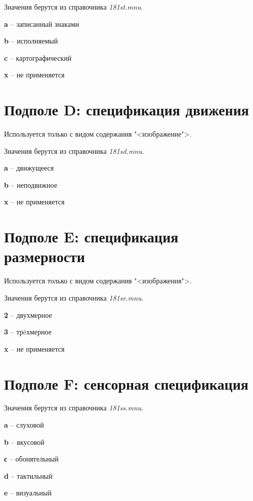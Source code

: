 Значения берутся из справочника \emph{181st.mnu}.

\begin{cutelist}
    \item \textbf{a} -- записанный знаками
    \item \textbf{b} -- исполняемый
    \item \textbf{c} -- картографический
    \item \textbf{x} -- не применяется
\end{cutelist}

\section{Подполе D: спецификация движения}

Используется только с видом содержания "<изображение">.

Значения берутся из справочника \emph{181sd.mnu}.

\begin{cutelist}
    \item \textbf{a} -- движущееся
    \item \textbf{b} -- неподвижное
    \item \textbf{x} -- не применяется
\end{cutelist}

\section{Подполе E: спецификация размерности}

Используется только с видом содержания "<изображения">.

Значения берутся из справочника \emph{181sr.mnu}.

\begin{cutelist}
    \item \textbf{2} -- двухмерное
    \item \textbf{3} -- тр\"eхмерное
    \item \textbf{x} -- не применяется
\end{cutelist}

\section{Подполе F: сенсорная спецификация}

Значения берутся из справочника \emph{181ss.mnu}.

\begin{cutelist}
    \item \textbf{a} -- слуховой
    \item \textbf{b} -- вкусовой
    \item \textbf{с} -- обонятельный
    \item \textbf{d} -- тактильный
    \item \textbf{e} -- визуальный
\end{cutelist}
